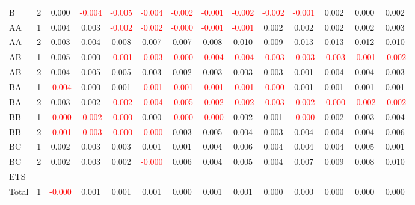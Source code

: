 \begin{table}[!htb]
{\begin{tabular}{llcccccccccccc}
B & 2 & 0.000 & \textcolor{red}{-0.004} & \textcolor{red}{-0.005} & \textcolor{red}{-0.004} & \textcolor{red}{-0.002} & \textcolor{red}{-0.001} & \textcolor{red}{-0.002} & \textcolor{red}{-0.002} & \textcolor{red}{-0.001} & 0.002 & 0.000 & 0.002\\
AA & 1 & 0.004 & 0.003 & \textcolor{red}{-0.002} & \textcolor{red}{-0.002} & \textcolor{red}{-0.000} & \textcolor{red}{-0.001} & \textcolor{red}{-0.001} & 0.002 & 0.002 & 0.002 & 0.002 & 0.003\\
AA & 2 & 0.003 & 0.004 & 0.008 & 0.007 & 0.007 & 0.008 & 0.010 & 0.009 & 0.013 & 0.013 & 0.012 & 0.010\\
AB & 1 & 0.005 & 0.000 & \textcolor{red}{-0.001} & \textcolor{red}{-0.003} & \textcolor{red}{-0.000} & \textcolor{red}{-0.004} & \textcolor{red}{-0.004} & \textcolor{red}{-0.003} & \textcolor{red}{-0.003} & \textcolor{red}{-0.003} & \textcolor{red}{-0.001} & \textcolor{red}{-0.002}\\
AB & 2 & 0.004 & 0.005 & 0.005 & 0.003 & 0.002 & 0.003 & 0.003 & 0.003 & 0.001 & 0.004 & 0.004 & 0.003\\
BA & 1 & \textcolor{red}{-0.004} & 0.000 & 0.001 & \textcolor{red}{-0.001} & \textcolor{red}{-0.001} & \textcolor{red}{-0.001} & \textcolor{red}{-0.001} & \textcolor{red}{-0.000} & 0.001 & 0.001 & 0.001 & 0.001\\
BA & 2 & 0.003 & 0.002 & \textcolor{red}{-0.002} & \textcolor{red}{-0.004} & \textcolor{red}{-0.005} & \textcolor{red}{-0.002} & \textcolor{red}{-0.002} & \textcolor{red}{-0.003} & \textcolor{red}{-0.002} & \textcolor{red}{-0.000} & \textcolor{red}{-0.002} & \textcolor{red}{-0.002}\\
BB & 1 & \textcolor{red}{-0.000} & \textcolor{red}{-0.002} & \textcolor{red}{-0.000} & 0.000 & \textcolor{red}{-0.000} & \textcolor{red}{-0.000} & 0.002 & 0.001 & \textcolor{red}{-0.000} & 0.002 & 0.003 & 0.004\\
BB & 2 & \textcolor{red}{-0.001} & \textcolor{red}{-0.003} & \textcolor{red}{-0.000} & \textcolor{red}{-0.000} & 0.003 & 0.005 & 0.004 & 0.003 & 0.004 & 0.004 & 0.004 & 0.006\\
BC & 1 & 0.002 & 0.003 & 0.003 & 0.001 & 0.001 & 0.004 & 0.006 & 0.004 & 0.004 & 0.004 & 0.005 & 0.001\\
BC & 2 & 0.002 & 0.003 & 0.002 & \textcolor{red}{-0.000} & 0.006 & 0.004 & 0.005 & 0.004 & 0.007 & 0.009 & 0.008 & 0.010\\
\hline
ETS &  &  &  &  &  &  &  &  &  &  &  &  & \\
\hline
Total & 1 & \textcolor{red}{-0.000} & 0.001 & 0.001 & 0.001 & 0.000 & 0.001 & 0.001 & 0.000 & 0.000 & 0.000 & 0.000 & 0.000\\

\end{tabular}}
\end{table}
